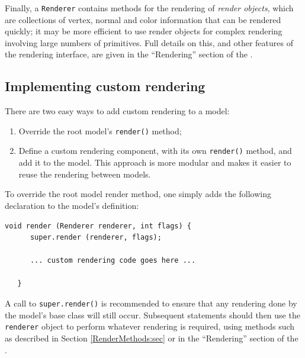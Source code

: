 %
Finally, a {\tt Renderer} contains methods for the rendering of {\it
render objects}, which are collections of vertex, normal and color
information that can be rendered quickly; it may be more efficient to
use render objects for complex rendering involving large numbers of
primitives. Full details on this, and other features of the rendering
interface, are given in the ``Rendering'' section of the
.

\subsection{Implementing custom rendering}

There are two easy ways to add custom rendering to a model:

\begin{enumerate}

\item Override the root model's {\tt render()} method;

\item Define a custom rendering component, with its own {\tt render()} method, and add it to
the model. This approach is more modular and makes it easier to reuse
the rendering between models.

\end{enumerate}

To override the root model render method, one simply adds the
following declaration to the model's definition:
%
\begin{lstlisting}[]
   void render (Renderer renderer, int flags) {
      super.render (renderer, flags);
      
      ... custom rendering code goes here ...

   }
\end{lstlisting}
%
A call to {\tt super.render()} is recommended to ensure that any
rendering done by the model's base class will still occur. Subsequent
statements should then use the {\tt renderer} object to perform
whatever rendering is required, using methods such as described in
Section \ref{RenderMethods:sec} or in the ``Rendering'' section of the
.

